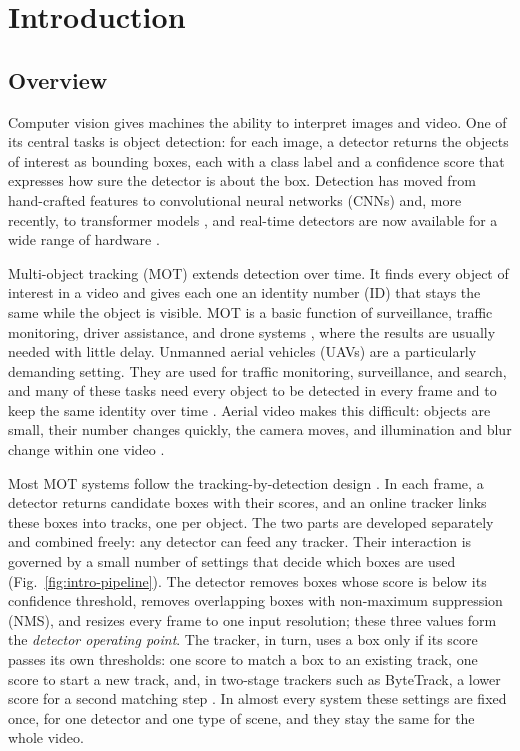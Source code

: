 \chapter{Introduction}\label{ch:intro}

\section{Overview}\label{sec:intro-overview}
Computer vision gives machines the ability to interpret images and video. One of its central tasks is object detection: for each image, a detector returns the objects of interest as bounding boxes, each with a class label and a confidence score that expresses how sure the detector is about the box. Detection has moved from hand-crafted features to convolutional neural networks (CNNs) and, more recently, to transformer models \cite{li2025motreview,ren2017fasterrcnn,redmon2016yolo,carion2020detr}, and real-time detectors are now available for a wide range of hardware \cite{ismail2026realtime}.

Multi-object tracking (MOT) extends detection over time. It finds every object of interest in a video and gives each one an identity number (ID) that stays the same while the object is visible. MOT is a basic function of surveillance, traffic monitoring, driver assistance, and drone systems \cite{zhu2022visdrone,wu2022uavsurvey,geiger2012kitti}, where the results are usually needed with little delay. Unmanned aerial vehicles (UAVs) are a particularly demanding setting. They are used for traffic monitoring, surveillance, and search, and many of these tasks need every object to be detected in every frame and to keep the same identity over time \cite{wu2022uavsurvey,zhu2022visdrone}. Aerial video makes this difficult: objects are small, their number changes quickly, the camera moves, and illumination and blur change within one video \cite{zhu2022visdrone,du2018uavdt,cheng2023smallobject}.

Most MOT systems follow the tracking-by-detection design \cite{adzemovic2026survey,bewley2016sort,zhang2022bytetrack,ismail2026realtime}. In each frame, a detector returns candidate boxes with their scores, and an online tracker links these boxes into tracks, one per object. The two parts are developed separately and combined freely: any detector can feed any tracker. Their interaction is governed by a small number of settings that decide which boxes are used (Fig.~\ref{fig:intro-pipeline}). The detector removes boxes whose score is below its confidence threshold, removes overlapping boxes with non-maximum suppression (NMS), and resizes every frame to one input resolution; these three values form the \emph{detector operating point}. The tracker, in turn, uses a box only if its score passes its own thresholds: one score to match a box to an existing track, one score to start a new track, and, in two-stage trackers such as ByteTrack, a lower score for a second matching step \cite{zhang2022bytetrack}. In almost every system these settings are fixed once, for one detector and one type of scene, and they stay the same for the whole video.

